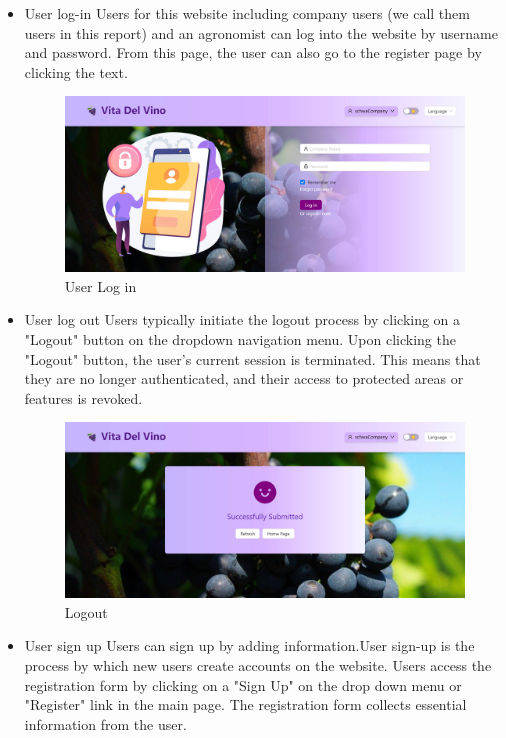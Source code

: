 \begin{enumerate}
          \begin{itemize}
              \item User log-in
                    Users for this website including company users (we call them users in this report)  and an agronomist can log into the website by username and password. From this page, the user can also go to the register page by clicking the text.
                    \begin{figure}
                        \centering
                        \includegraphics[width=0.75\linewidth]{images/Login.jpg}
                        \caption{User Log in}
                        \label{fig:Login}
                    \end{figure}
              \item User log out
                    Users typically initiate the logout process by clicking on a "Logout" button on the dropdown navigation menu. Upon clicking the "Logout" button, the user's current session is terminated. This means that they are no longer authenticated, and their access to protected areas or features is revoked.
                    \begin{figure}
                        \centering
                        \includegraphics[width=0.75\linewidth]{images/Logout.jpg}
                        \caption{Logout}
                        \label{fig:Logout}
                    \end{figure}
              \item User sign up
                    Users can sign up by adding information.User sign-up is the process by which new users create accounts on the website.  Users access the registration form by clicking on a "Sign Up" on the drop down menu or "Register" link in the main page. The registration form collects essential information from the user.

\end{itemize}
\end{enumerate}
